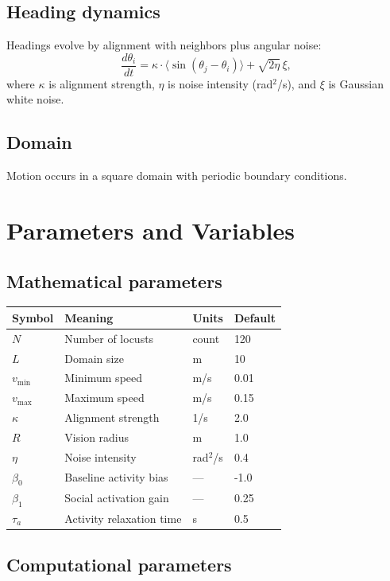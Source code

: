 \documentclass[11pt,a4paper]{article}
\begin{document}
\subsection{Heading dynamics}
Headings evolve by alignment with neighbors plus angular noise:
\[
\frac{d\theta_i}{dt} = \kappa \cdot \langle \sin(\theta_j - \theta_i)\rangle + \sqrt{2\eta}\,\xi,
\]
where $\kappa$ is alignment strength, $\eta$ is noise intensity (rad$^2$/s), and $\xi$ is Gaussian white noise.

\subsection{Domain}
Motion occurs in a square domain with periodic boundary conditions.

\section{Parameters and Variables}

\subsection{Mathematical parameters}

\begin{tabular}{@{}llll@{}}
\toprule
Symbol & Meaning & Units & Default \\
\midrule
$N$ & Number of locusts & count & 120 \\
$L$ & Domain size & m & 10 \\
$v_{\min}$ & Minimum speed & m/s & 0.01 \\
$v_{\max}$ & Maximum speed & m/s & 0.15 \\
$\kappa$ & Alignment strength & 1/s & 2.0 \\
$R$ & Vision radius & m & 1.0 \\
$\eta$ & Noise intensity & rad$^2$/s & 0.4 \\
$\beta_0$ & Baseline activity bias & --- & -1.0 \\
$\beta_1$ & Social activation gain & --- & 0.25 \\
$\tau_a$ & Activity relaxation time & s & 0.5 \\
\bottomrule
\end{tabular}

\subsection{Computational parameters}
\end{document}
